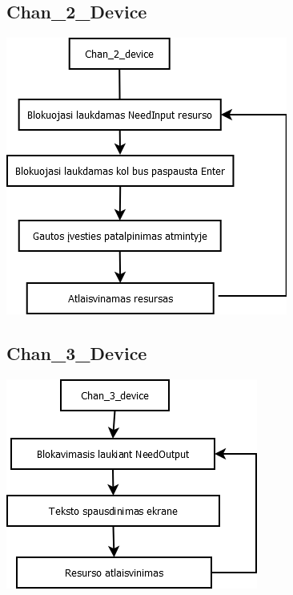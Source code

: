 	\subsection{Chan\_2\_Device}
		\begin{center}
			\includegraphics[scale=0.9]{diagramos/chan2Device.png}
		\end{center}
	\subsection{Chan\_3\_Device}
		\begin{center}
			\includegraphics[scale=0.9]{diagramos/chan3Device.png}
		\end{center}

